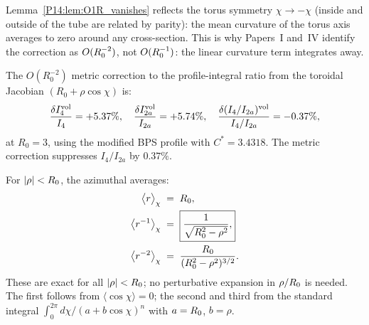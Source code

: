 \begin{remark}
\label{P14:rem:geometric_interp}
Lemma~\ref{P14:lem:O1R_vanishes} reflects the torus symmetry $\chi\to-\chi$
(inside and outside of the tube are related by parity):
the mean curvature of the torus axis averages to zero around any cross-section.
This is why Papers~I and~IV identify the correction as $O(R_0^{-2})$,
not $O(R_0^{-1})$: the linear curvature term integrates away.
\end{remark}

\begin{proposition}[Volume correction at $R_0 = 3$]
\label{P14:prop:volume_correction}
The $O(R_0^{-2})$ metric correction to the profile-integral ratio
from the toroidal Jacobian $(R_0 + \rho\cos\chi)$ is:
\begin{equation}
  \frac{\delta I_4^{\rm vol}}{I_4} = +5.37\%, \quad
  \frac{\delta I_{2a}^{\rm vol}}{I_{2a}} = +5.74\%, \quad
  \frac{\delta(I_4/I_{2a})^{\rm vol}}{I_4/I_{2a}} = -0.37\%,
  \label{P14:eq:volume_correction}
\end{equation}
at $R_0=3$, using the modified BPS profile with $C^*=3.4318$.
The metric correction suppresses $I_4/I_{2a}$ by $0.37\%$.
\end{proposition}

\begin{proposition}
\label{P14:prop:exact_avg}
For $|\rho| < R_0$, the azimuthal averages:
\begin{align}
  \bigl\langle r\bigr\rangle_\chi
  &\;=\; R_0,
  \label{P14:eq:avg_r}\\
  \bigl\langle r^{-1}\bigr\rangle_\chi
  &\;=\; \boxed{\frac{1}{\sqrt{R_0^2-\rho^2}},}
  \label{P14:eq:avg_rinv}\\
  \bigl\langle r^{-2}\bigr\rangle_\chi
  &\;=\; \frac{R_0}{(R_0^2-\rho^2)^{3/2}}.
  \label{P14:eq:avg_r2inv}
\end{align}
These are exact for all $|\rho|<R_0$; no perturbative expansion
in $\rho/R_0$ is needed.
The first follows from $\langle\cos\chi\rangle=0$; the second and
third from the standard integral
$\int_0^{2\pi}d\chi/(a+b\cos\chi)^n$ with $a=R_0$, $b=\rho$.
\end{proposition}

